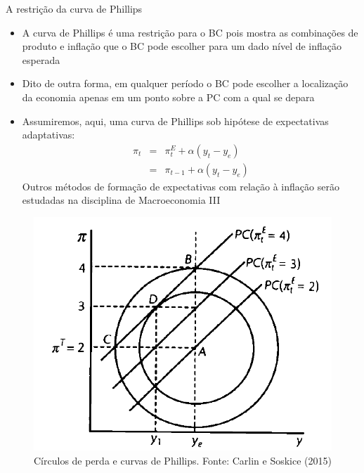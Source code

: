 \documentclass[10pt]{beamer}
\begin{document}
\begin{frame}
    {A restrição da curva de Phillips}
    \begin{itemize}
        \item A curva de Phillips é uma restrição para o BC pois mostra as combinações de produto e inflação que o BC pode escolher para um dado nível de inflação esperada\bigskip
        \item Dito de outra forma, em qualquer período o BC pode escolher a localização da economia apenas em um ponto sobre a PC com a qual se depara\bigskip
        \item Assumiremos, aqui, uma curva de Phillips sob hipótese de expectativas adaptativas:
        \begin{eqnarray}
            \pi_t &=& \pi_t^E + \alpha(y_t - y_e) \nonumber \\
            &=& \pi_{t-1} + \alpha(y_t - y_e)
        \end{eqnarray}
         Outros métodos de formação de expectativas com relação à inflação serão estudadas na disciplina de Macroeconomia III
    \end{itemize}
\end{frame}

\begin{frame}
    \begin{figure}
        \includegraphics[width=.6\textwidth]{./figures/aula16_fig5.PNG}
        \caption{Círculos de perda e curvas de Phillips. Fonte: Carlin e Soskice (2015)}
    \end{figure}
\end{frame}
\end{document}
